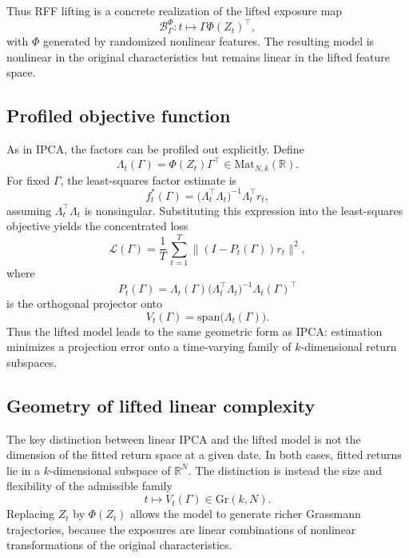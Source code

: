 \documentclass[11pt,letterpaper]{article}
\newcommand{\gr}{\mathrm{Gr}}
\newcommand{\bR}{\mathbb{R}}
\newcommand{\cB}{\mathcal{B}}
\newcommand{\cL}{\mathcal{L}}
\begin{document}
Thus RFF lifting is a concrete realization of the lifted exposure map
\begin{equation*}
\cB_\Gamma^\Phi : t \mapsto \Gamma\Phi(Z_t)^\top,
\end{equation*}
with $\Phi$ generated by randomized nonlinear features. The resulting model is nonlinear in the original characteristics but remains linear in the lifted feature space.

\subsection{Profiled objective function}
\label{subsec:rff-profiled-objective}

As in IPCA, the factors can be profiled out explicitly. Define
\begin{equation}
\label{eq:rff-lambda}
\Lambda_t(\Gamma)=\Phi(Z_t)\Gamma^\top \in \mathrm{Mat}_{N,k}(\bR).
\end{equation}
For fixed $\Gamma$, the least-squares factor estimate is
\begin{equation}
\label{eq:rff-factor-profile}
f_t^*(\Gamma) = \big(\Lambda_t^\top\Lambda_t\big)^{-1} \Lambda_t^\top r_t,
\end{equation}
assuming $\Lambda_t^\top\Lambda_t$ is nonsingular. Substituting this expression into the least-squares objective yields the concentrated loss
\begin{equation}
\label{eq:rff-profiled}
\cL(\Gamma)=\frac{1}{T}\,\sum_{t=1}^T \|(I-P_t(\Gamma))r_t\|^2,
\end{equation}
where
\begin{equation}
\label{eq:rff-projector}
P_t(\Gamma)=\Lambda_t(\Gamma)\big(\Lambda_t^\top\Lambda_t\big)^{-1}\Lambda_t(\Gamma)^\top
\end{equation}
is the orthogonal projector onto
\begin{equation}
\label{eq:rff-return-subspace}
V_t(\Gamma) = \mathrm{span}\big(\Lambda_t(\Gamma)\big).
\end{equation}
Thus the lifted model leads to the same geometric form as IPCA: estimation minimizes a projection error onto a time-varying family of $k$-dimensional return subspaces.

\subsection{Geometry of lifted linear complexity}
\label{subsec:rff-geometry}

The key distinction between linear IPCA and the lifted model is not the dimension of the fitted return space at a given date. In both cases, fitted returns lie in a $k$-dimensional subspace of $\bR^N$. The distinction is instead the size and flexibility of the admissible family
\begin{equation}
\label{eq:rff-grassmann-trajectory}
t\mapsto V_t(\Gamma)\in\gr(k,N).
\end{equation}
Replacing $Z_t$ by $\Phi(Z_t)$ allows the model to generate richer Grassmann trajectories, because the exposures are linear combinations of nonlinear transformations of the original characteristics.
\end{document}
